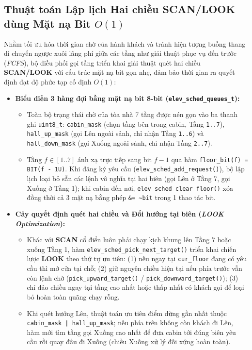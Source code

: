 \subsection{Thuật toán Lập lịch Hai chiều SCAN/LOOK dùng Mặt nạ Bit \texorpdfstring{$O(1)$}{O(1)}}
Nhằm tối ưu hóa thời gian chờ của hành khách và tránh hiện tượng buồng thang di chuyển ngược xuôi lãng phí giữa các tầng như giải thuật phục vụ đến trước (\textit{FCFS}), bộ điều phối gọi tầng triển khai giải thuật quét hai chiều \textbf{SCAN/LOOK} với cấu trúc mặt nạ bit gọn nhẹ, đảm bảo thời gian ra quyết định đạt độ phức tạp cố định $O(1)$:
\begin{itemize}[nosep]
    \item \textbf{Biểu diễn 3 hàng đợi bằng mặt nạ bit 8-bit (\texttt{elev\_sched\_queues\_t}):}
    \begin{itemize}[nosep]
        \item Toàn bộ trạng thái chờ của tòa nhà 7 tầng được nén gọn vào ba thanh ghi \texttt{uint8\_t}: \texttt{cabin\_mask} (chọn tầng bên trong cabin, Tầng \texttt{1..7}), \texttt{hall\_up\_mask} (gọi Lên ngoài sảnh, chỉ nhận Tầng \texttt{1..6}) và \texttt{hall\_down\_mask} (gọi Xuống ngoài sảnh, chỉ nhận Tầng \texttt{2..7}).
        \item Tầng $f \in [1..7]$ ánh xạ trực tiếp sang bit $f - 1$ qua hàm \texttt{floor\_bit(f) = BIT(f - 1U)}. Khi đăng ký yêu cầu (\texttt{elev\_sched\_add\_request()}), bộ lập lịch loại bỏ sẵn các lệnh vô nghĩa tại hai biên (gọi Lên ở Tầng 7, gọi Xuống ở Tầng 1); khi cabin đến nơi, \texttt{elev\_sched\_clear\_floor()} xóa đồng thời cả 3 mặt nạ bằng phép \texttt{\&= \textasciitilde bit} trong 1 thao tác bit.
    \end{itemize}
    \item \textbf{Cây quyết định quét hai chiều và Đổi hướng tại biên (\textit{LOOK Optimization}):}
    \begin{itemize}[nosep]
        \item Khác với \textbf{SCAN} cổ điển luôn phải chạy kịch khung lên Tầng 7 hoặc xuống Tầng 1, hàm \texttt{elev\_sched\_pick\_next\_target()} triển khai chiến lược \textbf{LOOK} theo thứ tự ưu tiên: (1) nếu ngay tại \texttt{cur\_floor} đang có yêu cầu thì mở cửa tại chỗ; (2) giữ nguyên chiều hiện tại nếu phía trước vẫn còn lệnh chờ (\texttt{pick\_upward\_target()} / \texttt{pick\_downward\_target()}); (3) chỉ đảo chiều ngay tại tầng cao nhất hoặc thấp nhất có khách gọi để loại bỏ hoàn toàn quãng chạy rỗng.
        \item Khi quét hướng Lên, thuật toán ưu tiên điểm dừng gần nhất thuộc \texttt{cabin\_mask | hall\_up\_mask}; nếu phía trên không còn khách đi Lên, hàm mới tìm tầng gọi Xuống cao nhất để đưa cabin tới đúng biên yêu cầu rồi quay đầu đi Xuống (chiều Xuống xử lý đối xứng hoàn toàn).

\end{itemize}
\end{itemize}
